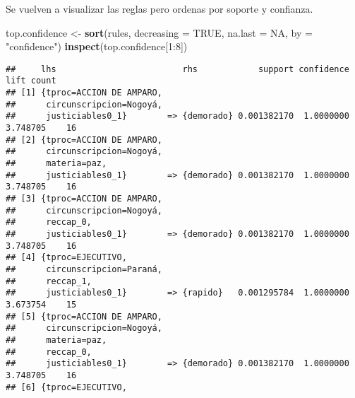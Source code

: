 \documentclass[runningheads,a4paper]{llncs}
\newenvironment{Shaded}{}{}
\newcommand{\KeywordTok}[1]{\textcolor[rgb]{0.00,0.44,0.13}{\textbf{{#1}}}}
\newcommand{\DataTypeTok}[1]{\textcolor[rgb]{0.56,0.13,0.00}{{#1}}}
\newcommand{\DecValTok}[1]{\textcolor[rgb]{0.25,0.63,0.44}{{#1}}}
\newcommand{\StringTok}[1]{\textcolor[rgb]{0.25,0.44,0.63}{{#1}}}
\newcommand{\OtherTok}[1]{\textcolor[rgb]{0.00,0.44,0.13}{{#1}}}
\newcommand{\NormalTok}[1]{{#1}}
\newcommand{\OperatorTok}[1]{\textcolor[rgb]{0.40,0.40,0.40}{{#1}}}
\begin{document}
Se vuelven a visualizar las reglas pero ordenas por soporte y confianza.

\begin{Shaded}
\begin{Highlighting}[]
\NormalTok{top.confidence <-}\StringTok{ }\KeywordTok{sort}\NormalTok{(rules, }\DataTypeTok{decreasing =} \OtherTok{TRUE}\NormalTok{, }
                       \DataTypeTok{na.last =} \OtherTok{NA}\NormalTok{, }\DataTypeTok{by =} \StringTok{"confidence"}\NormalTok{)}
\KeywordTok{inspect}\NormalTok{(top.confidence[}\DecValTok{1}\OperatorTok{:}\DecValTok{8}\NormalTok{])}
\end{Highlighting}
\end{Shaded}

\begin{verbatim}
##     lhs                         rhs            support confidence     lift count
## [1] {tproc=ACCION DE AMPARO,                                                    
##      circunscripcion=Nogoyá,                                                    
##      justiciables0_1}        => {demorado} 0.001382170  1.0000000 3.748705    16
## [2] {tproc=ACCION DE AMPARO,                                                    
##      circunscripcion=Nogoyá,                                                    
##      materia=paz,                                                               
##      justiciables0_1}        => {demorado} 0.001382170  1.0000000 3.748705    16
## [3] {tproc=ACCION DE AMPARO,                                                    
##      circunscripcion=Nogoyá,                                                    
##      reccap_0,                                                                  
##      justiciables0_1}        => {demorado} 0.001382170  1.0000000 3.748705    16
## [4] {tproc=EJECUTIVO,                                                           
##      circunscripcion=Paraná,                                                    
##      reccap_1,                                                                  
##      justiciables0_1}        => {rapido}   0.001295784  1.0000000 3.673754    15
## [5] {tproc=ACCION DE AMPARO,                                                    
##      circunscripcion=Nogoyá,                                                    
##      materia=paz,                                                               
##      reccap_0,                                                                  
##      justiciables0_1}        => {demorado} 0.001382170  1.0000000 3.748705    16
## [6] {tproc=EJECUTIVO,                                                           

\end{verbatim}
\end{document}
